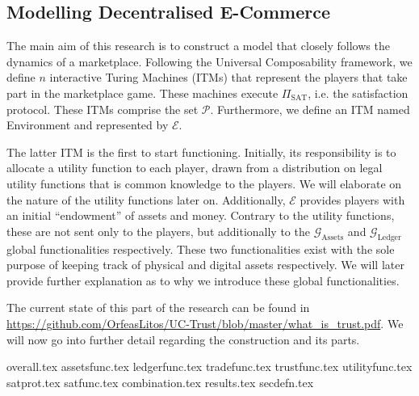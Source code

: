 \subsection{Modelling Decentralised E-Commerce}
  The main aim of this research is to construct a model that closely follows the dynamics
  of a marketplace. Following the Universal Composability framework, we define $n$
  interactive Turing Machines (ITMs) that represent the players that take part in the
  marketplace game. These machines execute $\Pi_{\mathrm{SAT}}$, i.e. the satisfaction
  protocol. These ITMs comprise the set $\mathcal{P}$. Furthermore, we define an ITM
  named Environment and represented by $\mathcal{E}$.

  The latter ITM is the first to start functioning. Initially, its responsibility is to
  allocate a utility function to each player, drawn from a distribution on legal utility
  functions that is common knowledge \cite{knowledge} to the players. We will elaborate on
  the nature of the utility functions later on. Additionally, $\mathcal{E}$ provides
  players with an initial ``endowment'' of assets and money. Contrary to the utility
  functions, these are not sent only to the players, but additionally to the
  $\mathcal{G}_{\mathrm{Assets}}$ and $\mathcal{G}_{\mathrm{Ledger}}$ global
  functionalities respectively. These two functionalities exist with the sole purpose of
  keeping track of physical and digital assets respectively. We will later provide further
  explanation as to why we introduce these global functionalities.

  The current state of this part of the research can be found in
  \url{https://github.com/OrfeasLitos/UC-Trust/blob/master/what_is_trust.pdf}. We will
  now go into further detail regarding the construction and its parts.

  {overall.tex}
  {assetsfunc.tex}
  {ledgerfunc.tex}
  {tradefunc.tex}
  {trustfunc.tex}
  {utilityfunc.tex}
  {satprot.tex}
  {satfunc.tex}
  {combination.tex}
  {results.tex}
  {secdefn.tex}
